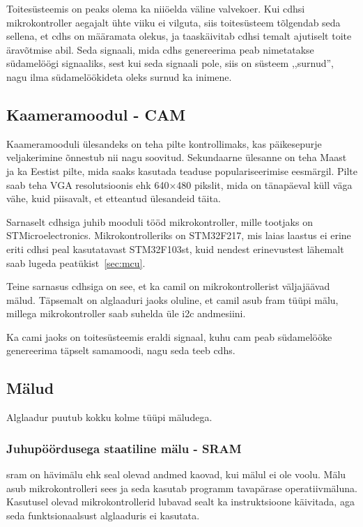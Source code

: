 \documentclass[12pt,a4paper]{article}
\begin{document}
Toitesüsteemis on peaks olema ka niiöelda väline valvekoer. Kui \gls{cdhs}i
mikrokontroller aegajalt ühte viiku ei vilguta, siis toitesüsteem tõlgendab seda
sellena, et \gls{cdhs} on määramata olekus, ja taaskäivitab \gls{cdhs}i temalt ajutiselt
toite äravõtmise abil. Seda signaali, mida \gls{cdhs} genereerima peab nimetatakse
südamelöögi signaaliks, sest kui seda signaali pole, siis on süsteem ,,surnud'',
nagu ilma südamelöökideta oleks surnud ka inimene.

\subsection{Kaameramoodul - CAM}
Kaameramooduli ülesandeks on teha pilte kontrollimaks, kas päikesepurje
veljakerimine õnnestub nii nagu soovitud. Sekundaarne ülesanne on teha Maast ja
ka Eestist pilte, mida saaks kasutada teaduse populariseerimise eesmärgil.
Pilte saab teha VGA resolutsioonis ehk 640\(\times\)480 pikslit, mida on
tänapäeval küll väga vähe, kuid piisavalt, et etteantud ülesandeid täita.

Sarnaselt \gls{cdhs}iga juhib mooduli tööd mikrokontroller, mille tootjaks on
STMicroelectronics. Mikrokontrolleriks on STM32F217, mis laias laastus ei erine
eriti \gls{cdhs}i peal kasutatavast STM32F103st, kuid nendest erinevustest lähemalt
saab lugeda peatükist~\ref{sec:mcu}.

Teine sarnasus \gls{cdhs}iga on see, et ka \gls{cam}il on mikrokontrollerist väljajäävad
mälud. Täpsemalt on alglaaduri jaoks oluline, et \gls{cam}il asub \gls{fram} tüüpi mälu,
millega mikrokontroller saab suhelda üle \gls{i2c} andmesiini.

Ka \gls{cam}i jaoks on toitesüsteemis eraldi signaal, kuhu \gls{cam} peab südamelööke
genereerima täpselt samamoodi, nagu seda teeb \gls{cdhs}.

\subsection{Mälud}
\label{sec:m2lud}
Alglaadur puutub kokku kolme tüüpi mäludega.

\subsubsection{Juhupöördusega staatiline mälu - SRAM}
\Gls{sram} on hävimälu ehk seal olevad andmed kaovad, kui mälul ei ole voolu.
Mälu asub mikrokontrolleri sees ja seda kasutab programm tavapärase
operatiivmäluna.  Kasutusel olevad mikrokontrollerid lubavad sealt ka
instruktsioone käivitada, aga seda funktsionaalsust alglaaduris ei kasutata.
\end{document}
